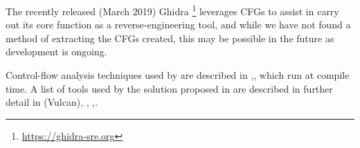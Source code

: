 The recently released (March 2019) Ghidra \footnote{\url{https://ghidra-sre.org}} leverages CFGs to assist in carry out its core function as a reverse-engineering tool, and while we have not found a method of extracting the CFGs created, this may be possible in the future as development is ongoing.

Control-flow analysis techniques used by \cite{Abadi2005} are described in \cite{AhoAlfredV.2014C:pt},\cite{Atkinson},\cite{Wagner2002} which run at compile time. A list of tools used by the solution proposed in \cite{Abadi2005} are described in further detail in \cite{Edwards2001}(Vulcan), \cite{AhoAlfredV.2014C:pt},\cite{Feng2003} \cite{Gopalakrishna2005},\cite{Wagner2002}.